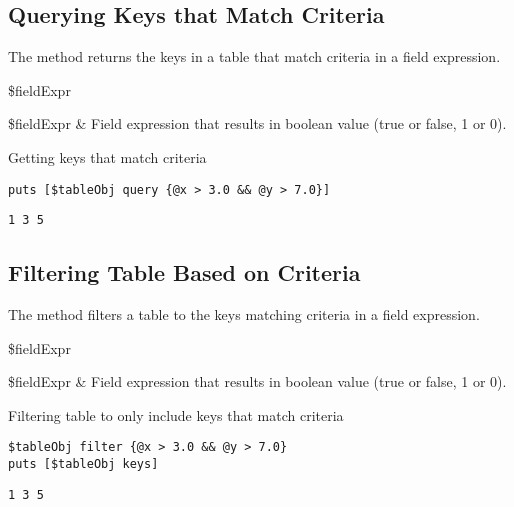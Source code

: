 \subsection{Querying Keys that Match Criteria}
The method  returns the keys in a table that match criteria in a field expression.
\begin{syntax}
 \$fieldExpr
\end{syntax}
\begin{args}
\$fieldExpr & Field expression that results in boolean value (true or false, 1 or 0).
\end{args}
\begin{example}{Getting keys that match criteria}
\begin{lstlisting}
puts [$tableObj query {@x > 3.0 && @y > 7.0}]
\end{lstlisting}
\tcblower
\begin{lstlisting}
1 3 5
\end{lstlisting}
\end{example}

\subsection{Filtering Table Based on Criteria}
The method  filters a table to the keys matching criteria in a field expression. 
\begin{syntax}
 \$fieldExpr
\end{syntax}
\begin{args}
\$fieldExpr & Field expression that results in boolean value (true or false, 1 or 0).
\end{args}
\begin{example}{Filtering table to only include keys that match criteria}
\begin{lstlisting}
$tableObj filter {@x > 3.0 && @y > 7.0}
puts [$tableObj keys]
\end{lstlisting}
\tcblower
\begin{lstlisting}
1 3 5
\end{lstlisting}
\end{example}

\clearpage

